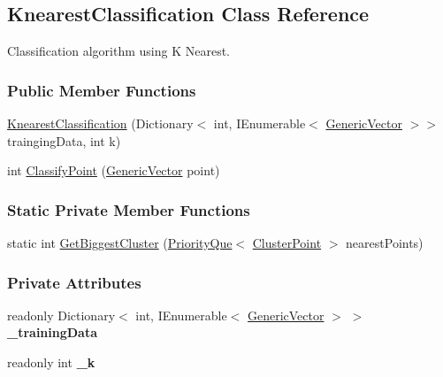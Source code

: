 \hypertarget{classDataTools_1_1classification_1_1KnearestClassification}{}\subsection{Knearest\+Classification Class Reference}
\label{classDataTools_1_1classification_1_1KnearestClassification}


Classification algorithm using K Nearest.  


\subsubsection*{Public Member Functions}
\begin{DoxyCompactItemize}
\item 
\hyperlink{classDataTools_1_1classification_1_1KnearestClassification_a588873a311daa525f0bdf6663b1d5eef_a588873a311daa525f0bdf6663b1d5eef}{Knearest\+Classification} (Dictionary$<$ int, I\+Enumerable$<$ \hyperlink{classDataTools_1_1GenericVector}{Generic\+Vector} $>$$>$ trainging\+Data, int k)
\item 
int \hyperlink{classDataTools_1_1classification_1_1KnearestClassification_a1c75b6bb19251c5c39a7bfe67a1a2b1f_a1c75b6bb19251c5c39a7bfe67a1a2b1f}{Classify\+Point} (\hyperlink{classDataTools_1_1GenericVector}{Generic\+Vector} point)
\end{DoxyCompactItemize}
\subsubsection*{Static Private Member Functions}
\begin{DoxyCompactItemize}
\item 
static int \hyperlink{classDataTools_1_1classification_1_1KnearestClassification_a6e263b4b9b6b29c78e2f5874c659f9b5_a6e263b4b9b6b29c78e2f5874c659f9b5}{Get\+Biggest\+Cluster} (\hyperlink{classDataTools_1_1utils_1_1PriorityQue}{Priority\+Que}$<$ \hyperlink{classDataTools_1_1clustering_1_1ClusterPoint}{Cluster\+Point} $>$ nearest\+Points)
\end{DoxyCompactItemize}
\subsubsection*{Private Attributes}
\begin{DoxyCompactItemize}
\item 
\mbox{\label{classDataTools_1_1classification_1_1KnearestClassification_af3b7ff0a4c49492be5b79482895d189c}} 
readonly Dictionary$<$ int, I\+Enumerable$<$ \hyperlink{classDataTools_1_1GenericVector}{Generic\+Vector} $>$ $>$ {\bfseries \+\_\+training\+Data}
\item 
\mbox{\label{classDataTools_1_1classification_1_1KnearestClassification_afc00c9b3229a9d2954b24471e6a7debc}} 
readonly int {\bfseries \+\_\+k}
\end{DoxyCompactItemize}


